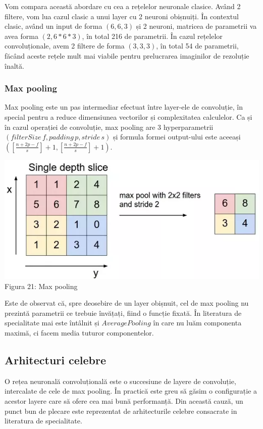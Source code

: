 Vom compara această abordare cu cea a rețelelor neuronale clasice. Având 2 filtere, vom lua cazul clasic a unui layer cu 2 neuroni obișnuiți. În contextul clasic, având un input de forma $(6,6,3)$ și 2 neuroni, matricea de parametrii va avea forma $(2,6*6*3)$, în total 216 de parametrii. În cazul rețelelor convoluționale, avem 2 filtere de forma $(3,3,3)$, în total 54 de parametrii, făcând aceste rețele mult mai viabile pentru prelucrarea imaginilor de rezoluție înaltă.

\subsubsection{Max pooling}
Max pooling este un pas intermediar efectuat între layer-ele de convoluție, în special pentru a reduce dimensiunea vectorilor și complexitatea calculelor. Ca și în cazul operației de convoluție, max pooling are 3 hyperparametrii $(filterSize \, f, padding \, p ,stride \, s)$ și formula formei output-ului este aceeași $\displaystyle{\left(\displaystyle{\left[\frac{n+2p-f}{s}\right]}+1, \displaystyle{\left[\frac{n+2p-f}{s}\right]}+1\right)}$.
 
\begin{center}
\includegraphics[scale=0.5]{maxPooling} \\
Figura 21: Max pooling
\end{center}

Este de observat că, spre deosebire de un layer obișnuit, cel de max pooling nu prezintă parametrii ce trebuie învățați, fiind o funcție fixată. În literatura de specialitate mai este întâlnit și $Average Pooling$ în care nu luăm componenta maximă, ci facem media tuturor componentelor.

\subsection{Arhitecturi celebre}
O rețea neuronală convoluțională este o succesiune de layere de convoluție, intercalate de cele de max pooling. În practică este greu să găsim o configurație a acestor layere care să ofere cea mai bună performanță. Din această cauză, un punct bun de plecare este reprezentat de arhitecturile celebre consacrate in literatura de specialitate.

